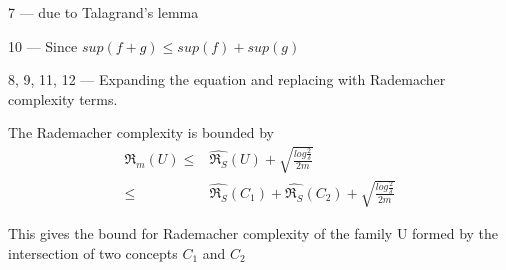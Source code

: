 \documentclass{article}
\begin{document}
7 --- due to Talagrand's lemma

10 --- Since \(sup(f+g) \le sup(f) + sup(g) \)

8, 9, 11, 12 --- Expanding the equation and replacing with Rademacher complexity terms.

The Rademacher complexity is bounded by 
\begin{align*}
  \mathfrak{R}_{m}(U) \le &  \hat{\mathfrak{R}_{S}}(U) + \sqrt{\frac{log{\frac{2}{\delta}}}{2m}} \\
  \le & \hat{\mathfrak{R}_{S}}(C_{1}) + \hat{\mathfrak{R}_{S}}(C_{2}) + \sqrt{\frac{log{\frac{2}{\delta}}}{2m}}
\end{align*}

This gives the bound for Rademacher complexity of the family U  formed by the intersection of two concepts \( C_{1}\) and \( C_{2} \)
\end{document}
